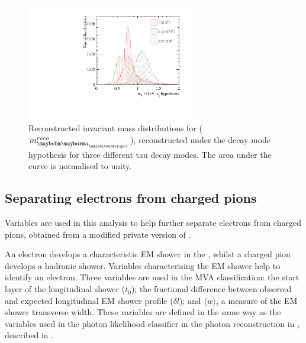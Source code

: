 \begin{figure}[htbp]
\centering
 \includegraphics[width=0.65\textwidth]{tau/var3/mA1A1Fit_100GeV_improved_zoom.pdf}
\caption
{Reconstructed invariant mass distributions for \Pai ($m^{reco}_{\Pai}$), reconstructed under the  \decayAiPhotonShort decay mode hypothesis for three different tau decay modes. The area under the curve is normalised to unity.}
\label{fig:tauVarMA1}
\end{figure}

\subsection{Separating electrons from charged pions}
\label{sec:tauVarEPiSeparation}

Variables are used in this analysis to help further separate  electrons from charged pions, obtained from a modified private version of \pandora.



An electron develops a characteristic EM shower in the \ECAL, whilst a charged pion develops a hadronic shower. Variables characterising the  EM shower help to identify an electron. Three variables are used in the MVA classification: the start layer of the longitudinal shower ($t_0$); the fractional difference between observed and expected longitudinal EM shower profile ($\delta{l}$); and $\langle{w}\rangle$, a measure of the EM shower transverse width. These variables are defined in the same way as the variables used in the photon likelihood classifier in the photon reconstruction in \pandora, described in .

